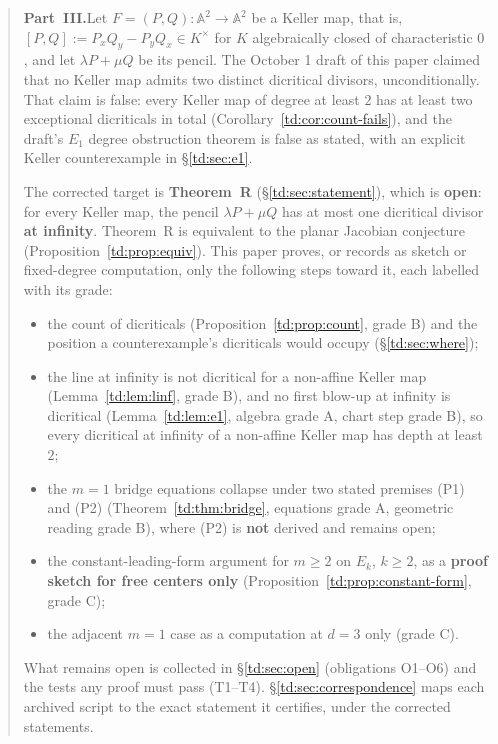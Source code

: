 \documentclass[a4paper,11pt]{article}
\theoremstyle{plain}
\theoremstyle{definition}
\theoremstyle{remark}
\begin{document}
\begin{abstract}
\medskip

\textbf{Part~III.}\enspace Let $F = (P,Q) \colon \mathbb{A}^2 \to \mathbb{A}^2$ be a Keller map, that is,
$[P,Q] := P_x Q_y - P_y Q_x \in K^\times$ for $K$ algebraically closed of characteristic $0$,
and let $\lambda P + \mu Q$ be its pencil. The October 1 draft of this paper claimed that no
Keller map admits two distinct dicritical divisors, unconditionally. That claim is false: every
Keller map of degree at least $2$ has at least two exceptional dicriticals in total
(Corollary~\ref{td:cor:count-fails}), and the draft's $E_1$ degree obstruction
theorem is false as stated, with an explicit Keller
counterexample in \S\ref{td:sec:e1}.

The corrected target is \textbf{Theorem~R} (\S\ref{td:sec:statement}), which is \textbf{open}:
for every Keller map, the pencil $\lambda P + \mu Q$ has at most one dicritical divisor
\textbf{at infinity}. Theorem~R is equivalent to the planar Jacobian conjecture
(Proposition~\ref{td:prop:equiv}). This paper proves, or records as sketch or fixed-degree
computation, only the following steps toward it, each labelled with its grade:
\begin{itemize}[nosep]
\item the count of dicriticals (Proposition~\ref{td:prop:count}, grade B) and the position a
counterexample's dicriticals would occupy (\S\ref{td:sec:where});
\item the line at infinity is not dicritical for a non-affine Keller map
(Lemma~\ref{td:lem:linf}, grade B), and no first blow-up at infinity is dicritical
(Lemma~\ref{td:lem:e1}, algebra grade A, chart step grade B), so every dicritical at infinity
of a non-affine Keller map has depth at least $2$;
\item the $m = 1$ bridge equations collapse under two stated premises (P1) and (P2)
(Theorem~\ref{td:thm:bridge}, equations grade A, geometric reading grade B), where (P2) is
\textbf{not} derived and remains open;
\item the constant-leading-form argument for $m \geq 2$ on $E_k$, $k \geq 2$, as a
\textbf{proof sketch for free centers only} (Proposition~\ref{td:prop:constant-form}, grade C);
\item the adjacent $m = 1$ case as a computation at $d = 3$ only (grade C).
\end{itemize}
What remains open is collected in \S\ref{td:sec:open} (obligations O1--O6) and the tests any
proof must pass (T1--T4). \S\ref{td:sec:correspondence} maps each archived script to the exact
statement it certifies, under the corrected statements.
\end{abstract}
\end{document}
